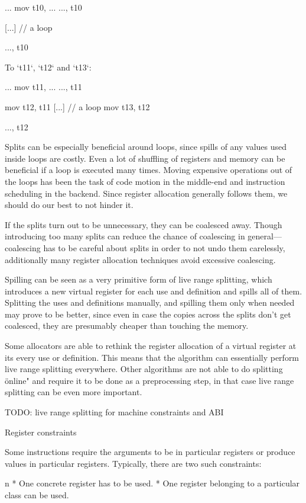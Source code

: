 \begtt
...
mov t10, ...
...,  t10

[...] // a loop

..., t10
\endtt

To `t11`, `t12` and `t13`:

\begtt
...
mov t11, ...
...,  t11

mov t12, t11
[...] // a loop
mov t13, t12

..., t12
\endtt

Splits can be especially beneficial around loops, since spills of any values
used inside loops are costly. Even a lot of shuffling of registers and memory
can be beneficial if a loop is executed many times. Moving expensive operations
out of the loops has been the task of code motion in the middle-end and
instruction scheduling in the backend. Since register allocation generally
follows them, we should do our best to not hinder it.

If the splits turn out to be unnecessary, they can be coalesced away. Though
introducing too many splits can reduce the chance of coalescing in
general---coalescing has to be careful about splits in order to not undo them
carelessly, additionally many register allocation techniques avoid excessive
coalescing.

Spilling can be seen as a very primitive form of live range splitting, which
introduces a new virtual register for each use and definition and spills all of
them. Splitting the uses and definitions manually, and spilling them only when
needed may prove to be better, since even in case the copies across the splits
don't get coalesced, they are presumably cheaper than touching the memory.

Some allocators are able to rethink the register allocation of a virtual
register at its every use or definition. This means that the algorithm can
essentially perform live range splitting everywhere. Other algorithms are not
able to do splitting \"online" and require it to be done as a preprocessing
step, in that case live range splitting can be even more important.

TODO: live range splitting for machine constraints and ABI


\seccc Register constraints

Some instructions require the arguments to be in particular registers or produce
values in particular registers. Typically, there are two such constraints:

\begitems\style n
* One concrete register has to be used.
* One register belonging to a particular class can be used.
\enditems

